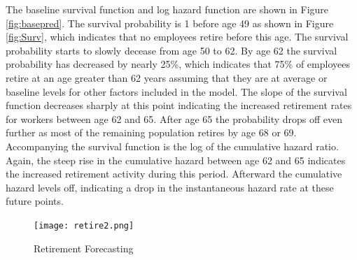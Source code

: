The baseline survival function and log hazard function are shown in Figure \ref{fig:basepred}. The survival probability is 1 before age 49 as shown in Figure \ref{fig:Surv}, which indicates that no employees retire before this age. The survival probability starts to slowly decease from age 50 to 62. By age 62 the survival probability has decreased by nearly 25\%, which indicates that 75\% of employees retire at an age greater than 62 years assuming that they are at average or baseline levels for other factors included in the model.  The slope of the survival function decreases sharply at this point indicating the increased retirement rates for workers between age 62 and 65.  After age 65 the probability drops off even further as most of the remaining population retires by age 68 or 69. Accompanying the survival function is the log of the cumulative hazard ratio.  Again, the steep rise in the cumulative hazard between age 62 and 65 indicates the increased retirement activity during this period.  Afterward the cumulative hazard levels off, indicating a drop in the instantaneous hazard rate at these future points.
\begin{figure}[h!]
	\centering
	\texttt{[image: retire2.png]}
	\caption{Retirement Forecasting}
	\label{fig:predict}	
	
\end{figure}
